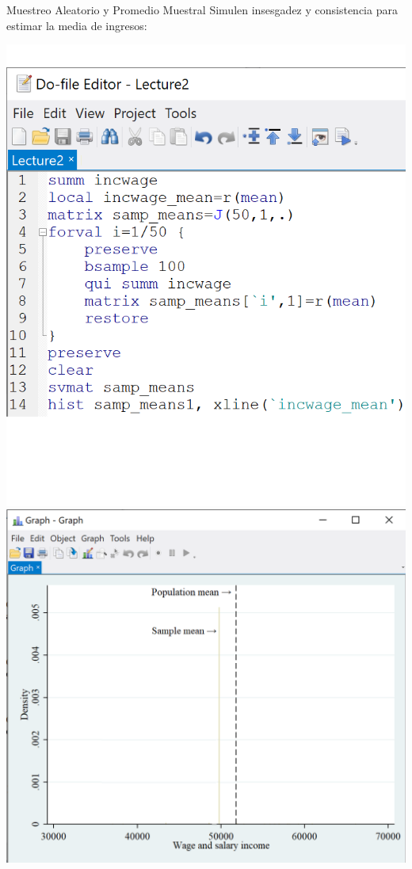 \documentclass[11pt,handout,aspectratio=169]{beamer}
\begin{document}
\begin{frame}{Muestreo Aleatorio y Promedio Muestral}
\vspace{0.2cm}
Simulen insesgadez  y consistencia para estimar la media de ingresos:

\begin{center}
\includegraphics[scale=0.45]{stata18.png} \includegraphics[scale=0.5]{stata19.png}
\end{center}

\end{frame}
\end{document}
